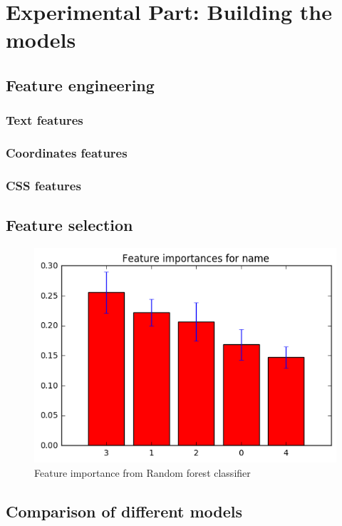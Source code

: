 \chapter{Experimental Part: Building the models}
\label{chap:model}
\section{Feature engineering}
\subsection{Text features}
\subsection{Coordinates features}
\subsection{CSS features}
\section{Feature selection}

\begin{figure}[h]
\begin{center}
\includegraphics[width=14cm]{figures06/feature_importance_names}
\caption{Feature importance from Random forest classifier}
\label{fig:feature_importance}
\end{center}
\end{figure}


\section{Comparison of different models}